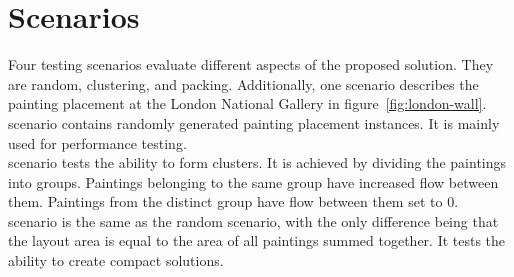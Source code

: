 \section{Scenarios}\label{sec:scenarios}

Four testing scenarios evaluate different aspects of the proposed solution.
They are random, clustering, and packing.
Additionally, one scenario describes the painting placement at the London National Gallery in figure~\ref{fig:london-wall}. \\

 scenario contains randomly generated painting placement instances.
It is mainly used for performance testing.
\\

 scenario tests the ability to form clusters.
It is achieved by dividing the paintings into groups.
Paintings belonging to the same group have increased flow between them.
Paintings from the distinct group have flow between them set to 0.
\\

 scenario is the same as the random scenario, with the only difference being that the layout area is equal to the area of all paintings summed together.
It tests the ability to create compact solutions.
\\


